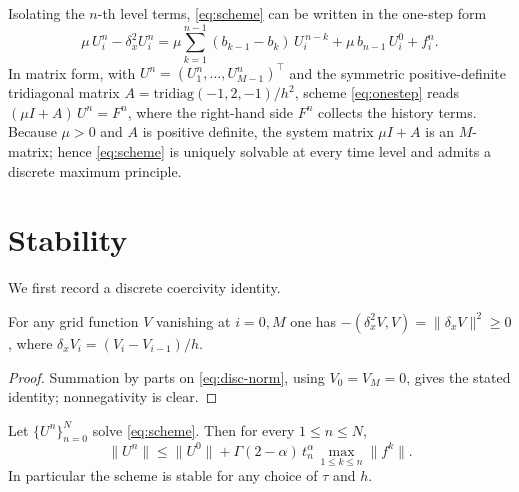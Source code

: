 \documentclass[11pt]{ajam}
\newcommand{\norm}[1]{\lVert #1 \rVert}
\newcommand{\Gam}{\Gamma}
\begin{document}
Isolating the $n$-th level terms, \eqref{eq:scheme} can be written in the
one-step form
\begin{equation}\label{eq:onestep}
  \mu\,U_i^n - \delta_x^2 U_i^n
  = \mu\sum_{k=1}^{n-1}(b_{k-1}-b_k)\,U_i^{\,n-k}
   + \mu\,b_{n-1}\,U_i^0 + f_i^n .
\end{equation}
In matrix form, with $U^n=(U_1^n,\dots,U_{M-1}^n)^{\!\top}$ and the
symmetric positive-definite tridiagonal matrix
$A=\mathrm{tridiag}(-1,2,-1)/h^2$, scheme \eqref{eq:onestep} reads
$(\mu I + A)\,U^n = F^n$, where the right-hand side $F^n$ collects the
history terms. Because $\mu>0$ and $A$ is positive definite, the system
matrix $\mu I + A$ is an $M$-matrix; hence \eqref{eq:scheme} is uniquely
solvable at every time level and admits a discrete maximum principle.

\section{Stability}\label{sec:stability}
We first record a discrete coercivity identity.

\begin{lemma}\label{lem:coercive}
For any grid function $V$ vanishing at $i=0,M$ one has
$-(\delta_x^2 V, V) = \norm{\delta_x V}^2 \ge 0$, where
$\delta_x V_i=(V_i-V_{i-1})/h$.
\end{lemma}

\begin{proof}
Summation by parts on \eqref{eq:disc-norm}, using $V_0=V_M=0$, gives the
stated identity; nonnegativity is clear.
\end{proof}

\begin{theorem}\label{thm:stability}
Let $\{U^n\}_{n=0}^N$ solve \eqref{eq:scheme}. Then for every
$1\le n\le N$,
\begin{equation}\label{eq:stab-bound}
  \norm{U^n} \le \norm{U^0}
  + \Gam(2-\alpha)\,t_n^{\alpha}\,\max_{1\le k\le n}\norm{f^k}.
\end{equation}
In particular the scheme is stable for any choice of $\tau$ and $h$.
\end{theorem}
\end{document}
